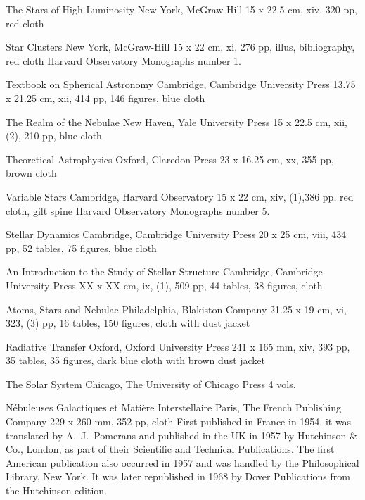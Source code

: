 {The Stars of High Luminosity}
{New York, McGraw-Hill}
{15 x 22.5 cm, xiv, 320 pp, red cloth}
{}

{Star Clusters}
{New York, McGraw-Hill}
{15 x 22 cm, xi, 276 pp, illus, bibliography, red cloth}
{}
Harvard Observatory Monographs number 1.

{Textbook on Spherical Astronomy}
{Cambridge, Cambridge University Press}
{13.75 x 21.25 cm, xii, 414 pp, 146 figures, blue cloth}
{}

{The Realm of the Nebulae}
{New Haven, Yale University Press}
{15 x 22.5 cm, xii, (2), 210 pp, blue cloth}
{}

{Theoretical Astrophysics}
{Oxford, Claredon Press}
{23 x 16.25 cm, xx, 355 pp, brown cloth}
{}

{Variable Stars}
{Cambridge, Harvard Observatory}
{15 x 22 cm, xiv, (1),386 pp, red cloth, gilt spine}
{}
Harvard Observatory Monographs number 5.

{Stellar Dynamics}
{Cambridge, Cambridge University Press}
{20 x 25 cm, viii, 434 pp, 52 tables, 75 figures, blue cloth}
{}

{An Introduction to the Study of Stellar Structure}
{Cambridge, Cambridge University Press}
{XX x XX cm, ix, (1), 509 pp, 44 tables, 38 figures, cloth}
{}

{Atoms, Stars and Nebulae}
{Philadelphia, Blakiston Company}
{21.25 x 19 cm, vi, 323, (3) pp, 16 tables, 150 figures, cloth with dust jacket}
{}

{Radiative Transfer}
{Oxford, Oxford University Press}
{241 x 165 mm, xiv, 393 pp, 35 tables, 35 figures, dark blue cloth with brown dust jacket}
{}

{The Solar System}
{Chicago, The University of Chicago Press}
{4 vols.}
{}

{N\'{e}buleuses Galactiques et Mati\`{e}re Interstellaire}
{Paris, The French Publishing Company}
{229 x 260 mm, 352 pp, cloth}
{}
First published in France in 1954, it was translated by A.\ J.\ Pomerans
and published in the UK in 1957 by Hutchinson \& Co., London, as part of their Scientific and 
Technical Publications.  The first American publication also occurred in 1957 and was 
handled by the Philosophical Library, New York. It was later republished in 1968 by Dover
Publications from the Hutchinson edition.

